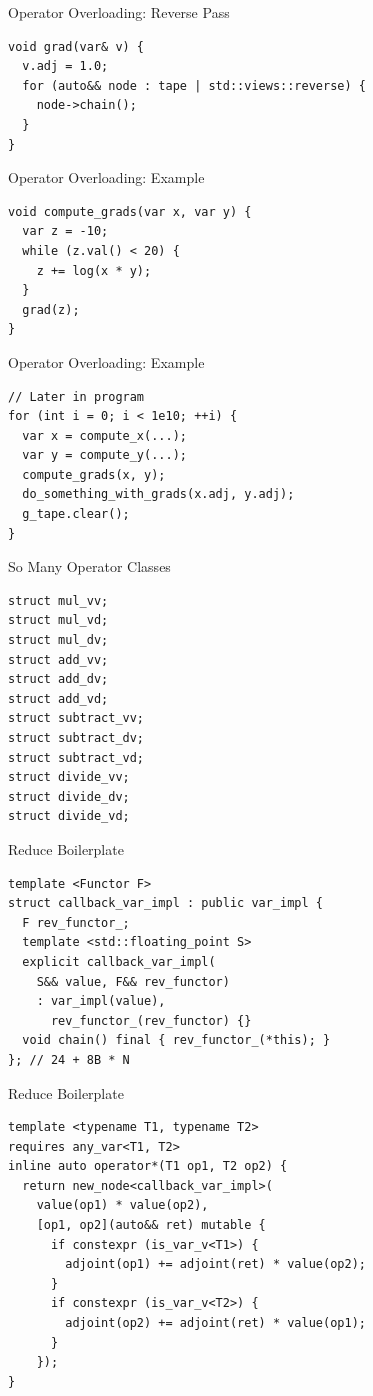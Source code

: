 \documentclass[dvipsnames]{beamer}
\begin{document}
\begin{frame}[fragile]{Operator Overloading: Reverse Pass}
\begin{verbatim}
void grad(var& v) {
  v.adj = 1.0;
  for (auto&& node : tape | std::views::reverse) {
    node->chain();
  }
}
\end{verbatim}
\end{frame}

\begin{frame}[fragile]{Operator Overloading: Example}
\begin{verbatim}
void compute_grads(var x, var y) {
  var z = -10;
  while (z.val() < 20) {
    z += log(x * y);
  }
  grad(z);
}
\end{verbatim}
\end{frame}

\begin{frame}[fragile]{Operator Overloading: Example}
\begin{verbatim}
// Later in program
for (int i = 0; i < 1e10; ++i) {
  var x = compute_x(...);
  var y = compute_y(...);
  compute_grads(x, y);
  do_something_with_grads(x.adj, y.adj);
  g_tape.clear();
}
\end{verbatim}
\end{frame}

\begin{frame}[fragile]{So Many Operator Classes}
\begin{verbatim}
struct mul_vv;
struct mul_vd;
struct mul_dv;
struct add_vv;
struct add_dv;
struct add_vd;
struct subtract_vv;
struct subtract_dv;
struct subtract_vd;
struct divide_vv;
struct divide_dv;
struct divide_vd;
\end{verbatim}
\end{frame}


\begin{frame}[fragile]{Reduce Boilerplate}
\begin{verbatim}
template <Functor F>
struct callback_var_impl : public var_impl {
  F rev_functor_;
  template <std::floating_point S>
  explicit callback_var_impl(
    S&& value, F&& rev_functor)
    : var_impl(value),
      rev_functor_(rev_functor) {}
  void chain() final { rev_functor_(*this); }
}; // 24 + 8B * N
\end{verbatim}
\end{frame}

\begin{frame}[fragile]{Reduce Boilerplate}
\begin{verbatim}
template <typename T1, typename T2>
requires any_var<T1, T2>
inline auto operator*(T1 op1, T2 op2) {
  return new_node<callback_var_impl>(
    value(op1) * value(op2),
    [op1, op2](auto&& ret) mutable {
      if constexpr (is_var_v<T1>) {
        adjoint(op1) += adjoint(ret) * value(op2);
      }
      if constexpr (is_var_v<T2>) {
        adjoint(op2) += adjoint(ret) * value(op1);
      }
    });
}
\end{verbatim}
\end{frame}
\end{document}
